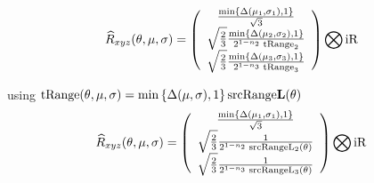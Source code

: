 \begin{equation}
\widehat{R}_{xyz}(\theta,\mu,\sigma) =
\left(
\begin{array}{c}
 \frac{\min\left\{\Delta(\mu_1,\sigma_1), 1 \right\}}{\sqrt{3}}  \\
 \sqrt{\frac{2}{3}} \frac{\min\left\{\Delta(\mu_2,\sigma_2), 1 \right\} }{2^{1-n_2} \; \text{tRange}_2} \\
 \sqrt{\frac{2}{3}} \frac{\min\left\{\Delta(\mu_3,\sigma_3), 1 \right\}}{2^{1-n_3} \; \text{tRange}_3} \\
\end{array}
\right) 
\bigotimes
\text{iR} 
\end{equation}

using $\text{tRange}(\theta,\mu,\sigma) = \min\left\{\Delta(\mu,\sigma), 1 \right\} \text{srcRange} \mathbf{L}(\theta) $
\begin{equation}
\widehat{R}_{xyz}(\theta,\mu,\sigma) =
\left(
\begin{array}{c}
 \frac{\min\left\{\Delta(\mu_1,\sigma_1), 1 \right\}}{\sqrt{3}}  \\
 \sqrt{\frac{2}{3}} \frac{1}{2^{1-n_2} \; \text{srcRange} \text{L}_2(\theta)} \\
 \sqrt{\frac{2}{3}} \frac{1}{2^{1-n_3} \; \text{srcRange} \text{L}_3(\theta)} \\
\end{array}
\right) 
\bigotimes
\text{iR} 
\end{equation}

